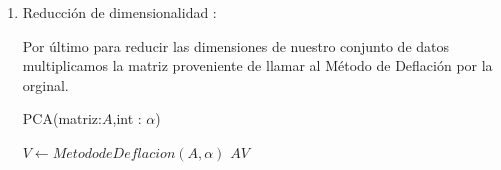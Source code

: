 \begin{enumerate}
\item Reducción de dimensionalidad :

Por último para reducir las dimensiones de nuestro conjunto de datos multiplicamos la matriz proveniente de llamar al Método de Deflación por la orginal.
\begin{algorithm}
\caption{PCA(matriz:$A$,int : $\alpha$)}
\begin{algorithmic}[1]
    \State $V  \leftarrow Metodo de Deflacion(A,\alpha)$
    \State
    \Return  $A V$
\end{algorithmic}
\end{algorithm}

\end{enumerate}





